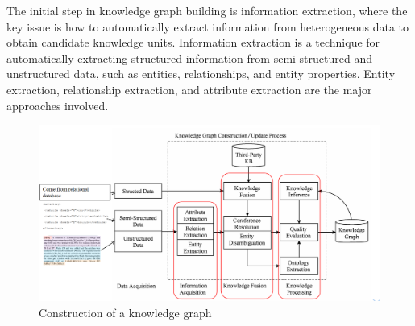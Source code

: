 \documentclass[%
 aip,
 jmp,%
 amsmath,amssymb,
 reprint,%
]{revtex4-2}
\begin{document}
The initial step in knowledge graph building is information extraction\cite{muhammad2020open}, where the key issue is how to automatically extract information from heterogeneous data to obtain candidate knowledge units. Information extraction is a technique for automatically extracting structured information from semi-structured and unstructured data, such as entities, relationships, and entity properties. Entity extraction, relationship extraction, and attribute extraction are the major approaches involved.

\begin{figure}[htbp]
    \centering
    \includegraphics[width=1\textwidth]{figure/8.png}
    \caption{ Construction of a knowledge graph }
    \label{ Fig.8 }
\end{figure}
\end{document}
